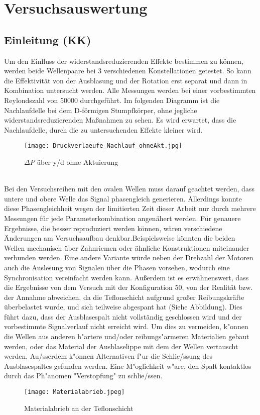 \chapter{Versuchsauswertung}
\label{s:auswertung}
\section{Einleitung (KK)}
\label{s:einleitungAusw}
Um den Einfluss der widerstandsreduzierenden Effekte bestimmen zu k\"onnen, werden beide Wellenpaare bei 3  verschiedenen Konstellationen getestet. So kann die Effektivit\"at von der Ausblasung und der Rotation erst separat und dann in Kombination untersucht werden.
Alle Messungen werden bei einer vorbestimmten Reylondszahl von 50000 durchgef\"uhrt.
Im folgenden Diagramm ist die Nachlaufdelle bei dem D-f\"ormigen Stumpfk\"orper, ohne jegliche widerstandsreduzierenden Ma\ss{}nahmen zu sehen. 
Es wird erwartet, dass die Nachlaufdelle, durch die zu untersuchenden Effekte kleiner wird.
\begin{figure}[h]
	\centering
	\texttt{[image: Druckverlaeufe\_Nachlauf\_ohneAkt.jpg]}
	\caption{ $\Delta P$ \"uber y/d ohne Aktuierung }
	\label{fig:Deltap-y/d_ohne_Aktuation}
\end{figure}
\\
Bei den Versuchsreihen mit den ovalen Wellen muss darauf geachtet werden, dass untere und obere Welle das Signal phasengleich generieren. Allerdings konnte diese Phasengleichheit wegen der limitierten Zeit dieser Arbeit nur durch mehrere Messungen f\"ur jede Parameterkombination angen\"ahert werden.
F\"ur genauere Ergebnisse, die besser reproduziert werden k\"onnen, w\"aren verschiedene \"Anderungen am Versuchsaufbau denkbar.Beispielsweise k\"onnten die beiden Wellen mechanisch \"uber Zahnriemen oder \"ahnliche Konstruktionen  miteinander verbunden werden. Eine andere Variante w\"urde neben der Drehzahl der Motoren auch die Auslesung von Signalen \"uber die Phasen  vorsehen, wodurch eine Synchronisation vereinfacht werden kann.
Au\ss{}erdem ist es erw\"ahnenswert, dass die Ergebnisse von dem Versuch mit der Konfiguration 50, von der Realit\"at bzw. der Annahme abweichen, da die Teflonschicht aufgrund
gro\ss{}er Reibungskr\"afte \"uberbelastet wurde, und sich teilweise abgespant hat (Siehe Abbildung).
Dies f\"uhrt dazu, dass der Ausblasespalt nicht vollst\"andig geschlossen wird und der vorbestimmte Signalverlauf nicht erreicht wird.
Um dies zu vermeiden, k"onnen die Wellen aus anderen h"artere und/oder reibungs"armeren Materialien gebaut werden, oder das Material der Ausblaselippe mit dem der Wellen vertauscht werden. Au/ss{}erdem k"onnen Alternativen f"ur die Schlie/ss{}ung des Ausblasespaltes gefunden werden. Eine M"oglichkeit w"are, den Spalt kontaktlos durch das Ph"anomen "Verstopfung" zu schlie/ss{}en.
\begin{figure}[h]
	\centering
	\texttt{[image: Materialabrieb.jpeg]}
	\caption{ Materialabrieb an der Teflonschicht }
	\label{fig:Materialabrieb}
\end{figure}



